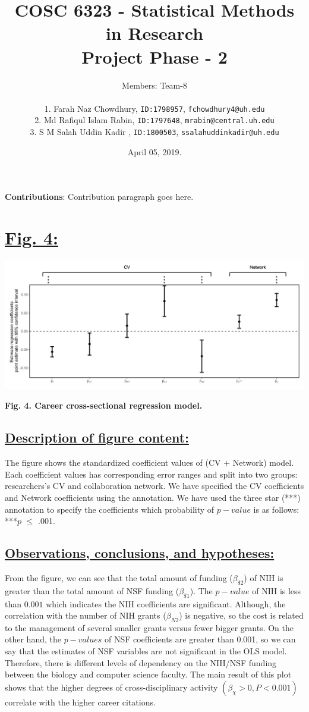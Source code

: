 \documentclass{article}\usepackage[]{graphicx}\usepackage[]{color}
\title{COSC 6323 - Statistical Methods in Research\\Project Phase - 2\\}
\author{%
    Members: Team-8 \\\\
    1. Farah Naz Chowdhury,    \texttt{ID:1798957}, \texttt{fchowdhury4@uh.edu}      \vspace{2pt} \\
    2. Md Rafiqul Islam Rabin, \texttt{ID:1797648}, \texttt{mrabin@central.uh.edu}   \vspace{2pt} \\
    3. S M Salah Uddin Kadir , \texttt{ID:1800503}, \texttt{ssalahuddinkadir@uh.edu} \vspace{2pt} \\
}
\date{April 05, 2019.}
\begin{document}
\maketitle
\par{\textbf{Contributions}: Contribution paragraph goes here.}

\newpage
\section*{\underline{Fig. 4:}}
\begin{center}
\includegraphics[scale=0.5]{Fig4.png}
\newline
\par{\textbf{Fig. 4. Career cross-sectional regression model.}}
\end{center}
\subsection*{\underline{Description of figure content:}}
\par{
The figure shows the standardized coefficient values of (CV + Network) model. Each coefficient values has corresponding error ranges and split into two groups: researchers's CV and collaboration network. We have specified the CV coefficients and Network coefficients using the annotation. We have used the three star (***) annotation to specify the coefficients which probability of $p-value$ is as follows: ***$\textit{p}$ $\leq$ .001.
}
\subsection*{\underline{Observations, conclusions, and hypotheses:}}
\par{
From the figure, we can see that the total amount of funding ($\beta_{\$2}$) of NIH is greater than the total amount of NSF funding ($\beta_{\$1}$). The $p-value$ of NIH is less than $0.001$ which indicates the NIH coefficients are significant. Although, the correlation with the number of NIH grants ($\beta_{N2}$) is negative, so the cost is related to the management of several smaller grants versus fewer bigger grants. On the other hand, the $p-values$ of NSF coefficients are greater than 0.001, so we can say that the estimates of NSF variables are not significant in the OLS model. Therefore, there is different levels of dependency on the NIH/NSF funding between the biology and computer science faculty. The main result of this plot shows that the higher degrees of cross-disciplinary activity $(\beta_{\chi} > 0, P < 0.001)$ correlate with the higher career citations.
}
\end{document}
